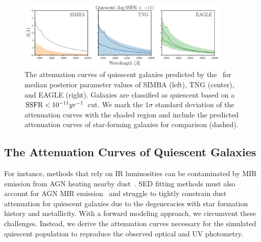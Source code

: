 \begin{figure}
\begin{center}
    \includegraphics[width=0.9\textwidth]{figs/abc_q_atten_unnorm.pdf}
    \caption{\label{fig:q_raw_atten}
    The attenuation curves of quiescent galaxies predicted by the \eda~for
    median posterior parameter values of SIMBA (left), TNG (center), and
    EAGLE (right).
    Galaxies are classified as quiescent based on a ${\rm SSFR} < 10^{-11}yr^{-1}$
    cut.
    We mark the $1\sigma$ standard deviation of the attenuation curves with
    the shaded region and include the predicted attenuation curves of
    star-forming galaxies for comparison (dashed). 
    }
\end{center}
\end{figure}
\subsection{The Attenuation Curves of Quiescent Galaxies}  
For instance, methods that rely on IR luminosities can be contaminated by MIR
emission from AGN heating nearby dust~\citep{kirkpatrick2015}. 
SED fitting methods must also account for AGN MIR
emission~\citep{salim2016, leja2018, salim2018} and struggle to tightly
constrain dust attenuation for quiescent galaxies due to the degeneracies
with star formation history and metallicity.
With a forward modeling approach, we circumvent these challenges. 
Instead, we derive the attenuation curves necessary for the simulated quiescent
population to reproduce the observed optical and UV photometry. 


